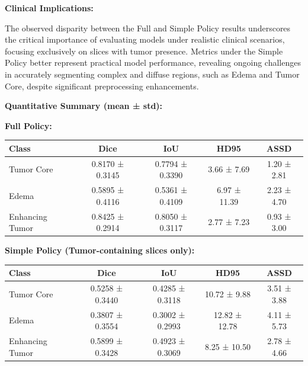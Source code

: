 \textbf{Clinical Implications:}

The observed disparity between the Full and Simple Policy results underscores the critical importance of evaluating models under realistic clinical scenarios, focusing exclusively on slices with tumor presence. Metrics under the Simple Policy better represent practical model performance, revealing ongoing challenges in accurately segmenting complex and diffuse regions, such as Edema and Tumor Core, despite significant preprocessing enhancements.

\textbf{Quantitative Summary (mean ± std):}

\vspace{1em}
\noindent\textbf{Full Policy:}

\begin{center}
\begin{tabular}{lcccc}
\toprule
\textbf{Class} & \textbf{Dice} & \textbf{IoU} & \textbf{HD95} & \textbf{ASSD} \\
\midrule
Tumor Core       & 0.8170 ± 0.3145 & 0.7794 ± 0.3390 & 3.66 ± 7.69 & 1.20 ± 2.81 \\
Edema            & 0.5895 ± 0.4116 & 0.5361 ± 0.4109 & 6.97 ± 11.39 & 2.23 ± 4.70 \\
Enhancing Tumor  & 0.8425 ± 0.2914 & 0.8050 ± 0.3117 & 2.77 ± 7.23 & 0.93 ± 3.00 \\
\bottomrule
\end{tabular}
\end{center}

\vspace{1em}
\noindent\textbf{Simple Policy (Tumor-containing slices only):}

\begin{center}
\begin{tabular}{lcccc}
\toprule
\textbf{Class} & \textbf{Dice} & \textbf{IoU} & \textbf{HD95} & \textbf{ASSD} \\
\midrule
Tumor Core       & 0.5258 ± 0.3440 & 0.4285 ± 0.3118 & 10.72 ± 9.88 & 3.51 ± 3.88 \\
Edema            & 0.3807 ± 0.3554 & 0.3002 ± 0.2993 & 12.82 ± 12.78 & 4.11 ± 5.73 \\
Enhancing Tumor  & 0.5899 ± 0.3428 & 0.4923 ± 0.3069 & 8.25 ± 10.50 & 2.78 ± 4.66 \\
\bottomrule
\end{tabular}
\end{center}

\vspace{1em}

